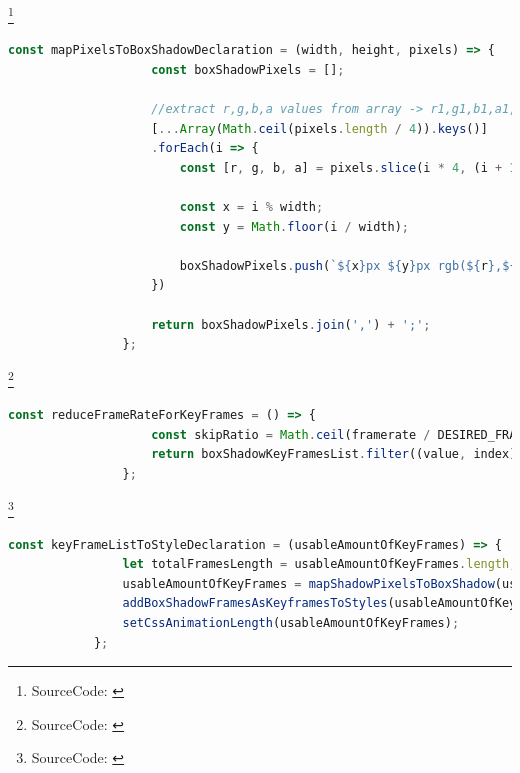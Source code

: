 \documentclass[xcolor=dvipsnames,10pt]{beamer}
\begin{document}
\begin{frame}[fragile]{\secname\footnote{SourceCode: \cite{videoToCss}}}
	\begin{center}
		\begin{minipage}{1\textwidth}
			\begin{lstlisting}[language=JavaScript, caption=mapPixelsToBoxShadowDeclaration()]
				const mapPixelsToBoxShadowDeclaration = (width, height, pixels) => {
					const boxShadowPixels = [];

					//extract r,g,b,a values from array -> r1,g1,b1,a1,r2,g2,b2,a2
					[...Array(Math.ceil(pixels.length / 4)).keys()]
					.forEach(i => {
						const [r, g, b, a] = pixels.slice(i * 4, (i + 1) * 4);

						const x = i % width;
						const y = Math.floor(i / width);

						boxShadowPixels.push(`${x}px ${y}px rgb(${r},${g},${b},${a})`);
					})

					return boxShadowPixels.join(',') + ';';
				};
			\end{lstlisting}
		\end{minipage}
	\end{center}
\end{frame}
\begin{frame}[fragile]{\secname\footnote{SourceCode: \cite{videoToCss}}}
	\begin{center}
		\begin{minipage}{1\textwidth}
			\begin{lstlisting}[language=JavaScript, caption=reduceFrameRateForKeyFrames()]
				const reduceFrameRateForKeyFrames = () => {
					const skipRatio = Math.ceil(framerate / DESIRED_FRAMERATE);
					return boxShadowKeyFramesList.filter((value, index) => (index % skipRatio === 0));
				};
			\end{lstlisting}
		\end{minipage}
	\end{center}
\end{frame}
\begin{frame}[fragile]{\secname\footnote{SourceCode: \cite{videoToCss}}}
	\begin{center}
		\begin{minipage}{1\textwidth}
			\begin{lstlisting}[language=JavaScript, caption=keyFrameListToStyleDeclaration()]
			const keyFrameListToStyleDeclaration = (usableAmountOfKeyFrames) => {
				let totalFramesLength = usableAmountOfKeyFrames.length;
				usableAmountOfKeyFrames = mapShadowPixelsToBoxShadow(usableAmountOfKeyFrames, totalFramesLength);
				addBoxShadowFramesAsKeyframesToStyles(usableAmountOfKeyFrames);
				setCssAnimationLength(usableAmountOfKeyFrames);
			};
			\end{lstlisting}
		\end{minipage}
	\end{center}
\end{frame}
\end{document}
